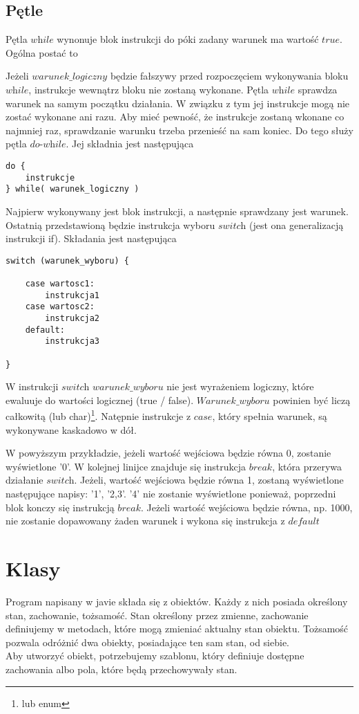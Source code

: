 \documentclass[11pt]{article}
\begin{document}
\subsection{Pętle}
Pętla $\textit{while}$ wynonuje blok instrukcji do póki zadany warunek ma wartość $\textit{true}$. Ogólna postać to
 
Jeżeli $\textit{warunek\_logiczny}$ będzie fałszywy przed rozpoczęciem wykonywania bloku $\textit{while}$, instrukcje wewnątrz bloku nie zostaną wykonane. Pętla $\textit{while}$ sprawdza warunek na samym początku działania. W związku z tym jej instrukcje mogą nie zostać wykonane ani razu. Aby mieć pewność, że instrukcje zostaną wkonane co najmniej raz, sprawdzanie warunku trzeba przenieść na sam koniec. Do tego służy pętla $\textit{do-while}$. Jej składnia jest następująca
\begin{lstlisting}
do { 
	instrukcje
} while( warunek_logiczny )
\end{lstlisting}
Najpierw wykonywany jest blok instrukcji, a następnie sprawdzany jest warunek.\\
Ostatnią przedstawioną będzie instrukcja wyboru $\textit{switch}$ (jest ona generalizacją instrukcji if). Składania jest następująca
\begin{lstlisting}
switch (warunek_wyboru) {

	case wartosc1:
		instrukcja1
	case wartosc2:
		instrukcja2
	default:
		instrukcja3

}
\end{lstlisting}
W instrukcji $\textit{switch}$ $\textit{warunek\_wyboru}$ nie jest wyrażeniem logiczny, które ewaluuje do wartości logicznej (true / false). $\textit{Warunek\_wyboru}$ powinien być liczą całkowitą (lub char)\footnote{lub enum}. Natępnie instrukcje z $\textit{case}$, który spełnia warunek, są wykonywane kaskadowo w dół.

W powyższym przykładzie, jeżeli wartość wejściowa będzie równa 0, zostanie wyświetlone '0'. W kolejnej linijce znajduje się instrukcja $\textit{break}$, która przerywa działanie $\textit{switch}$.
Jeżeli, wartość wejściowa będzie równa 1, zostaną wyświetlone następujące napisy: '1', '2,3'. '4' nie zostanie wyświetlone ponieważ, poprzedni blok konczy się instrukcją $break$. Jeżeli wartość wejściowa będzie równa, np. 1000, nie zostanie dopawowany żaden warunek i wykona się instrukcja z $\textit{default}$

\section{Klasy}
Program napisany w javie składa się z obiektów. Każdy z nich posiada określony stan, zachowanie, tożsamość. Stan określony przez zmienne, zachowanie definiujemy w metodach, które mogą zmieniać aktualny stan obiektu. Tożsamość pozwala odróżnić dwa obiekty, posiadające ten sam stan, od siebie. \\
Aby utworzyć obiekt, potrzebujemy szablonu, który definiuje dostępne zachowania albo pola, które będą przechowywały stan.\\
  
\end{document}
